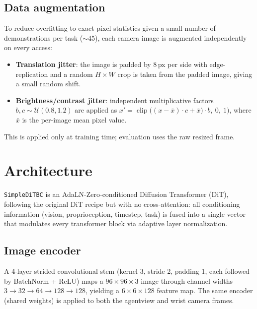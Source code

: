\documentclass[11pt]{article}
\begin{document}
\subsection{Data augmentation}

To reduce overfitting to exact pixel statistics given a small number of demonstrations per task
($\sim$45), each camera image is augmented independently on every access:
\begin{itemize}[nosep]
    \item \textbf{Translation jitter}: the image is padded by 8\,px per side with edge-replication
    and a random $H\times W$ crop is taken from the padded image, giving a small random shift.
    \item \textbf{Brightness/contrast jitter}: independent multiplicative factors
    $b, c \sim \mathcal{U}(0.8, 1.2)$ are applied as
    $x' = \operatorname{clip}\big((x - \bar{x}) \cdot c + \bar{x}) \cdot b,\ 0,\ 1\big)$,
    where $\bar{x}$ is the per-image mean pixel value.
\end{itemize}
This is applied only at training time; evaluation uses the raw resized frame.

\section{Architecture}

\texttt{SimpleDiTBC} is an AdaLN-Zero-conditioned Diffusion Transformer (DiT), following the
original DiT recipe but with no cross-attention: all conditioning information (vision,
proprioception, timestep, task) is fused into a single vector that modulates every transformer
block via adaptive layer normalization.

\subsection{Image encoder}

A 4-layer strided convolutional stem (kernel 3, stride 2, padding 1, each followed by
BatchNorm + ReLU) maps a $96 \times 96 \times 3$ image through channel widths
$3 \to 32 \to 64 \to 128 \to 128$, yielding a $6 \times 6 \times 128$ feature map. The same
encoder (shared weights) is applied to both the agentview and wrist camera frames.
\end{document}
